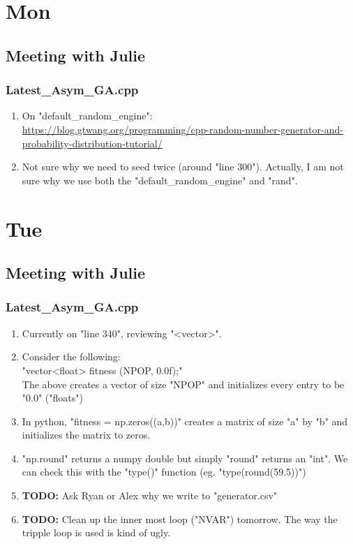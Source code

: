 \documentclass[12pt,letterpaper]{article}
\begin{document}
\section{Mon}
\subsection{Meeting with Julie}
\subsubsection{Latest\_Asym\_GA.cpp}
\begin{enumerate}
  \item On "default_random_engine":\\
    \url{https://blog.gtwang.org/programming/cpp-random-number-generator-and-probability-distribution-tutorial/}
  \item Not sure why we need to seed twice (around "line 300"). Actually, I am not sure
    why we use both the "default_random_engine" and "rand".
\end{enumerate}

\section{Tue}
\subsection{Meeting with Julie}
\subsubsection{Latest\_Asym\_GA.cpp}
\begin{enumerate}
  \item Currently on "line 340", reviewing "<vector>".
  \item Consider the following:\\
    "vector<float> fitness (NPOP, 0.0f);"\\
    The above creates a vector of size "NPOP" and initializes every entry to be "0.0" 
    ("floats")
  \item In python, "fitness = np.zeros((a,b))" creates a matrix of size "a" by "b" and
    initializes the matrix to zeros.
  \item "np.round" returns a numpy double but simply "round" returns an "int".
    We can check this with the "type()" function (eg. "type(round(59.5))")
  \item \textbf{TODO:} Ask Ryan or Alex why we write to "generator.csv"
  \item \textbf{TODO:} Clean up the inner most loop ("NVAR") tomorrow. The way the 
    tripple loop is used is kind of ugly.
\end{enumerate}
\end{document}
